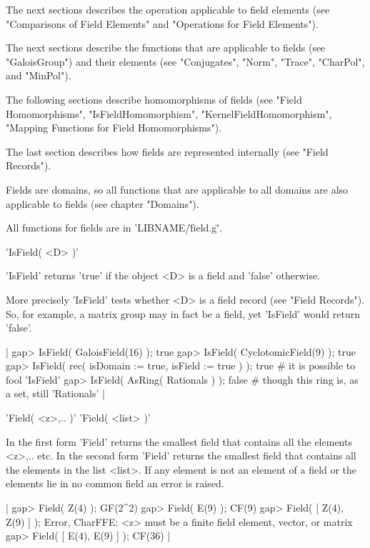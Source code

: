 The next sections describes  the operation applicable  to field  elements
(see  "Comparisons  of  Field  Elements"   and   "Operations  for   Field
Elements").

The next sections  describe the  functions that are applicable  to fields
(see   "GaloisGroup")  and their   elements  (see   "Conjugates", "Norm",
"Trace", "CharPol",  and  "MinPol").

The  following  sections  describe  homomorphisms  of fields  (see "Field
Homomorphisms",     "IsFieldHomomorphism",     "KernelFieldHomomorphism",
"Mapping Functions for Field Homomorphisms").

The  last  section  describes how  fields are represented internally (see
"Field Records").

Fields  are domains, so all functions  that are applicable to all domains
are also applicable to fields (see chapter "Domains").

All functions for fields are in 'LIBNAME/\"field.g\"'.


'IsField( <D> )'

'IsField'   returns  'true' if the   object <D>  is  a field  and 'false'
otherwise.

More precisely 'IsField' tests whether <D>  is a field record (see "Field
Records").  So, for example, a matrix group  may in fact be a field,  yet
'IsField' would return 'false'.

|    gap> IsField( GaloisField(16) );
    true
    gap> IsField( CyclotomicField(9) );
    true
    gap> IsField( rec( isDomain := true, isField := true ) );
    true    # it is possible to fool 'IsField'
    gap> IsField( AsRing( Rationals ) );
    false    # though this ring is, as a set, still 'Rationals' |


'Field( <z>,.. )'
'Field( <list> )'

In the first  form 'Field' returns  the smallest field  that contains all
the elements <z>,.. etc.  In the second form 'Field' returns the smallest
field that contains all the elements in  the list <list>.  If any element
is not an element of a  field or the  elements lie in no common  field an
error is raised.

|    gap> Field( Z(4) );
    GF(2^2)
    gap> Field( E(9) );
    CF(9)
    gap> Field( [ Z(4), Z(9) ] );
    Error, CharFFE: <z> must be a finite field element, vector, or matrix
    gap> Field( [ E(4), E(9) ] );
    CF(36) |

